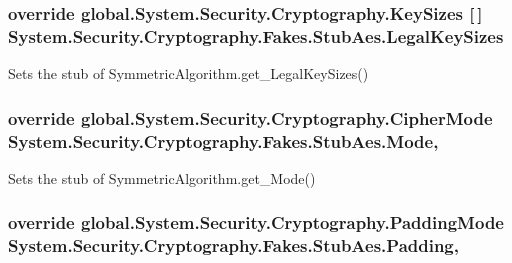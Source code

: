 \hypertarget{class_system_1_1_security_1_1_cryptography_1_1_fakes_1_1_stub_aes_a79fde93a2090b090d485996aa56aebb9}{
\subsubsection[{Legal\-Key\-Sizes}]{\setlength{\rightskip}{0pt plus 5cm}override global.\-System.\-Security.\-Cryptography.\-Key\-Sizes \mbox{[}$\,$\mbox{]} System.\-Security.\-Cryptography.\-Fakes.\-Stub\-Aes.\-Legal\-Key\-Sizes\hspace{0.3cm}{\ttfamily [get]}}}\label{class_system_1_1_security_1_1_cryptography_1_1_fakes_1_1_stub_aes_a79fde93a2090b090d485996aa56aebb9}


Sets the stub of Symmetric\-Algorithm.\-get\-\_\-\-Legal\-Key\-Sizes()

\hypertarget{class_system_1_1_security_1_1_cryptography_1_1_fakes_1_1_stub_aes_aa5bcc8ff6f93ba83585ef23b4ba1237a}{
\subsubsection[{Mode}]{\setlength{\rightskip}{0pt plus 5cm}override global.\-System.\-Security.\-Cryptography.\-Cipher\-Mode System.\-Security.\-Cryptography.\-Fakes.\-Stub\-Aes.\-Mode\hspace{0.3cm}{\ttfamily [get]}, {\ttfamily [set]}}}\label{class_system_1_1_security_1_1_cryptography_1_1_fakes_1_1_stub_aes_aa5bcc8ff6f93ba83585ef23b4ba1237a}


Sets the stub of Symmetric\-Algorithm.\-get\-\_\-\-Mode()

\hypertarget{class_system_1_1_security_1_1_cryptography_1_1_fakes_1_1_stub_aes_aa4970b2cf10f78e32b4640c28f754147}{
\subsubsection[{Padding}]{\setlength{\rightskip}{0pt plus 5cm}override global.\-System.\-Security.\-Cryptography.\-Padding\-Mode System.\-Security.\-Cryptography.\-Fakes.\-Stub\-Aes.\-Padding\hspace{0.3cm}{\ttfamily [get]}, {\ttfamily [set]}}}\label{class_system_1_1_security_1_1_cryptography_1_1_fakes_1_1_stub_aes_aa4970b2cf10f78e32b4640c28f754147}


